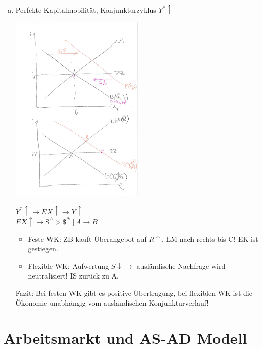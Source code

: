 \documentclass{scrartcl}
\begin{document}
\begin{enumerate}[a)]
\item Perfekte Kapitalmobilit\"{a}t, Konjunkturzyklus $Y^*\uparrow$
    \begin{center}
    \includegraphics[width=0.5\textwidth]{Bilder/MF7.pdf}
    \end{center}
$Y^*\uparrow \rightarrow EX \uparrow \rightarrow Y \uparrow$\\
$EX \uparrow \rightarrow \$^{A}> \$^{N} [A\rightarrow B]$\\
\begin{itemize}
  \item Feste WK: ZB kauft \"{U}berangebot auf $R\uparrow$, LM nach rechts bis C! EK ist gestiegen.
  \item Flexible WK: Aufwertung $S\downarrow \rightarrow$ ausl\"{a}ndische Nachfrage wird neutralisiert! IS zur\"{u}ck zu A.
\end{itemize}
Fazit: Bei festen WK gibt es positive \"{U}bertragung, bei flexiblen WK ist die \"{O}konomie unabh\"{a}ngig vom ausl\"{a}ndischen Konjunkturverlauf!
\end{enumerate}


\section{Arbeitsmarkt und AS-AD Modell}
\end{document}
